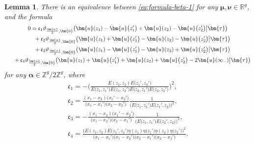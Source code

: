 \documentclass[10pt,a4paper]{amsart}
\numberwithin{equation}{section}
\newtheorem{Lemma}[Theorem]{Lemma}
\begin{document}
\begin{Lemma}
There is an equivalence between \eqref{eq:formula-beta-1} for any $\bm{\mu},\bm{\nu} \in \mathbb{R}^g$, and the formula
\begin{gather}
	0  = \mathfrak{c}_{1} \vartheta_{\frac{\bm{\alpha}}{2}, \bm{0}}\bigl(\bm{u}(z_1) - \bm{u}\bigl(z_1'\bigr) + \bm{u}(z_2) - \bm{u}\bigl(z_2'\bigr)\big|\bm{\tau}\bigr) \nonumber\\ \hphantom{0 =}{}
+ \mathfrak{c}_{2} \vartheta_{\frac{\bm{\alpha}}{2},\bm{0}}\bigl(\bm{u}(z_1) + \bm{u}\bigl(z_1'\bigr) - \bm{u}(z_2) - \bm{u}\bigl(z_2'\bigr)\big|\bm{\tau}\bigr) \nonumber\\ \hphantom{0 =}{}
+\mathfrak{c}_{3} \vartheta_{\frac{\bm{\alpha}}{2},\bm{0}}\bigl(\bm{u}(z_1) - \bm{u}\bigl(z'_1\bigr) - \bm{u}(z_2) + \bm{u}\bigl(z_2'\bigr)\big|\bm{\tau}\bigr) \nonumber\\ \hphantom{0 =}{}
+ \mathfrak{c}_{4} \vartheta_{\frac{\bm{\alpha}}{2},\bm{0}}\bigl(\bm{u}(z_1) + \bm{u}\bigl(z_1'\bigr)+\bm{u}(z_2)+\bm{u}\bigl(z_2'\bigr) - 2\bm{u}(\infty_-)\big|\bm{\tau}\bigr)\label{eq:equiv-beta-1}
\end{gather}
for any $\bm{\alpha} \in \mathbb{Z}^{g}/2\mathbb{Z}^{g}$, where
\begin{gather*}
\mathfrak{c}_1  = -\Biggl(\frac{E(z_1, z_2)E\bigl(z_1', z_2'\bigr)}{E\bigl(z_1, z_1'\bigr)E\bigl(z_1, z_2'\bigr)E\bigl(z_2, z_1'\bigr)E\bigl(z_2, z_2'\bigr)}\Biggr)^{2}, \\
\mathfrak{c}_2  = \frac{(x_1-x_2)\big(x_1'-x_2'\big)}{\bigl(x_1-x_1'\bigr)\bigl(x_2-x_2'\bigr)}\frac{1}{\bigl(E\bigl(z_1,z_2'\bigr)E\big(z_1', z_2\big)\bigr)^2}, \\
\mathfrak{c}_3  = -\frac{(x_1 - x_2)\big(x_1' -x_2'\big)}{\big(x_1 -x_2'\big)\bigl(x_2-x_1'\bigr)}\frac{1}{\bigl(E\bigl(z_1, z_1'\bigr)E\big(z_2', z_2\big)\bigr)^2}, \\
\mathfrak{c}_4  = \frac{\bigl(E(z_1, z_2)E\bigl(z_1', z_2'\bigr)\eta(z_1)\eta\bigl(z_1'\bigr)\eta(z_2)\eta\bigl(z_2'\bigr)\bigr)^{2}}{\bigl(x_1-x_1'\bigr)\bigl(x_1-x_2'\bigr)\bigl(x_2-x_1'\bigr)\bigl(x_2-x_2'\bigr)}.
\end{gather*}
\end{Lemma}
\end{document}
